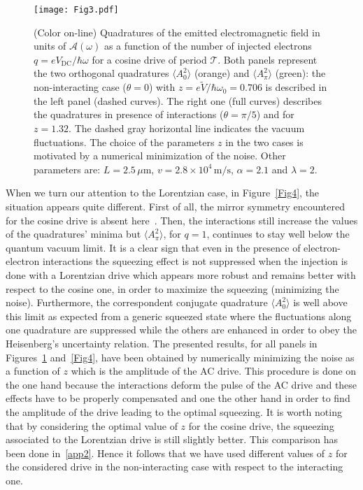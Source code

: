 \documentclass[12pt]{iopart}
\begin{document}
\begin{figure}[ht]
\centering
\texttt{[image: Fig3.pdf]}
\caption{(Color on-line) Quadratures of the emitted electromagnetic field in units of $\mathcal{A}(\omega)$ as a function of the number of injected electrons $q=eV_{\mathrm{DC}}/\hbar\omega$ for a cosine drive of period $\mathcal{T}$. Both panels represent the two orthogonal quadratures $\langle A_0^2\rangle$ (orange) and $\langle A_\pi^2\rangle$ (green): the non-interacting case ($\theta=0$) with $z=e\tilde{V}/\hbar\omega_0=0.706$ is described in the left panel (dashed curves). The right one (full curves) describes the quadratures in presence of interactions ($\theta=\pi/5$) and for $z=1.32$. The dashed gray horizontal line indicates the vacuum fluctuations. The choice of the parameters $z$ in the two cases is motivated by a numerical minimization of the noise. Other parameters are: $L=2.5\,\mu\mathrm{m}$, $v=2.8\times 10^4\, \mathrm{m/s}$, $\alpha=2.1$ and $\lambda=2$.
} 
\label{Fig3}
\end{figure}  
When we turn our attention to the Lorentzian case, in Figure~\ref{Fig4}, the situation appears quite different. First of all, the mirror symmetry encountered for the cosine drive is absent here~\cite{Dubois13, Ronetti19b}. Then, the interactions still increase the values of the quadratures' minima but $\langle A^2_{\pi}\rangle$, for $q=1$, continues to stay well below the quantum vacuum limit. It is a clear sign that even in the presence of electron-electron interactions the squeezing effect is not suppressed when the injection is done with a Lorentzian drive which appears more robust and remains better with respect to the cosine one, in order to maximize the squeezing (minimizing the noise). Furthermore, the correspondent conjugate quadrature $\langle{A_0^2}\rangle$ is well above this limit as expected from a generic squeezed state where the fluctuations along one quadrature are suppressed while the others are enhanced in order to obey the Heisenberg's uncertainty relation. The presented results, for all panels in Figures~\ref{Fig3} and~\ref{Fig4}, have been obtained by numerically minimizing the noise as a function of $z$ which is the amplitude of the AC drive. This procedure is done on the one hand because the interactions deform the pulse of the AC drive and these effects have to be properly compensated and one the other hand in order to find the amplitude of the drive leading to the optimal squeezing. It is worth noting that by considering the optimal value of $z$ for the cosine drive, the squeezing associated to the Lorentzian drive is still slightly better. This comparison has been done in~\ref{app2}. Hence it follows that we have used different values of $z$ for the considered drive in the non-interacting case with respect to the interacting one.\\
\end{document}
